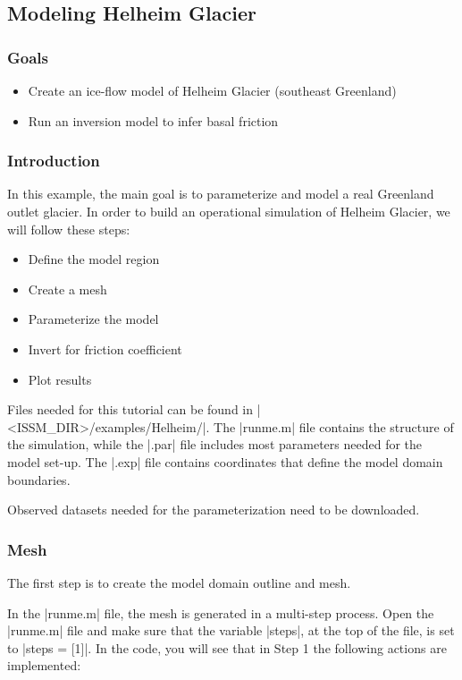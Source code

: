 
\subsection{Modeling Helheim Glacier} \label{sec:using-issm-tutorials-helheim}
\subsubsection{Goals}
\begin{itemize}
	\item Create an ice-flow model of Helheim Glacier (southeast Greenland)
	\item Run an inversion model to infer basal friction
\end{itemize}

\subsubsection{Introduction}
In this example, the main goal is to parameterize and model a real Greenland outlet glacier. In order to build an operational simulation of Helheim Glacier, we will follow these steps:
\begin{itemize}
	\item Define the model region
	\item Create a mesh
	\item Parameterize the model
	\item Invert for friction coefficient
	\item Plot results
\end{itemize}

Files needed for this tutorial can be found in \lstinlinebg|<ISSM_DIR>/examples/Helheim/|. The \lstinlinebg|runme.m| file contains the structure of the simulation, while the \lstinlinebg|.par| file includes most parameters needed for the model set-up. The \lstinlinebg|.exp| file contains coordinates that define the model domain boundaries.

Observed datasets needed for the parameterization need to be downloaded.

\subsubsection{Mesh}
The first step is to create the model domain outline and mesh.

In the \lstinlinebg|runme.m| file, the mesh is generated in a multi-step process. Open the \lstinlinebg|runme.m| file and make sure that the variable \lstinlinebg|steps|, at the top of the file, is set to \lstinlinebg|steps = [1]|. In the code, you will see that in Step 1 the following actions are implemented:

